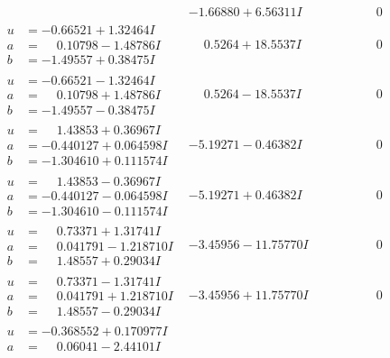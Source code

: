 \documentclass[1p]{elsarticle_modified}
\theoremstyle{definition}
\begin{document}
$$\begin{array}{c|c|c}
 & -1.66880 + 6.56311 I & \phantom{-0.000000 } 0 \\ \hline\begin{aligned}
u &= -0.66521 + 1.32464 I \\
a &= \phantom{-}0.10798 - 1.48786 I \\
b &= -1.49557 + 0.38475 I\end{aligned}
 & \phantom{-}0.5264 + 18.5537 I & \phantom{-0.000000 } 0 \\ \hline\begin{aligned}
u &= -0.66521 - 1.32464 I \\
a &= \phantom{-}0.10798 + 1.48786 I \\
b &= -1.49557 - 0.38475 I\end{aligned}
 & \phantom{-}0.5264 - 18.5537 I & \phantom{-0.000000 } 0 \\ \hline\begin{aligned}
u &= \phantom{-}1.43853 + 0.36967 I \\
a &= -0.440127 + 0.064598 I \\
b &= -1.304610 + 0.111574 I\end{aligned}
 & -5.19271 - 0.46382 I & \phantom{-0.000000 } 0 \\ \hline\begin{aligned}
u &= \phantom{-}1.43853 - 0.36967 I \\
a &= -0.440127 - 0.064598 I \\
b &= -1.304610 - 0.111574 I\end{aligned}
 & -5.19271 + 0.46382 I & \phantom{-0.000000 } 0 \\ \hline\begin{aligned}
u &= \phantom{-}0.73371 + 1.31741 I \\
a &= \phantom{-}0.041791 - 1.218710 I \\
b &= \phantom{-}1.48557 + 0.29034 I\end{aligned}
 & -3.45956 - 11.75770 I & \phantom{-0.000000 } 0 \\ \hline\begin{aligned}
u &= \phantom{-}0.73371 - 1.31741 I \\
a &= \phantom{-}0.041791 + 1.218710 I \\
b &= \phantom{-}1.48557 - 0.29034 I\end{aligned}
 & -3.45956 + 11.75770 I & \phantom{-0.000000 } 0 \\ \hline\begin{aligned}
u &= -0.368552 + 0.170977 I \\
a &= \phantom{-}0.06041 - 2.44101 I \\

\end{aligned}
\end{array}$$
\end{document}
